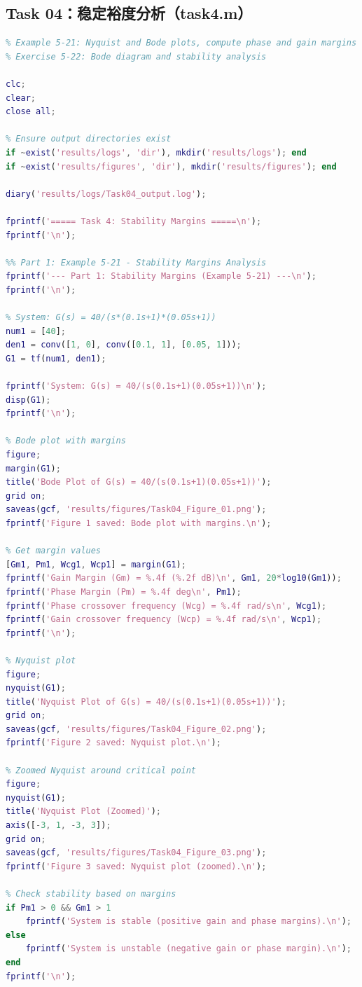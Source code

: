 \documentclass{../common/SCNU_Experimental_Report}
\begin{document}
\subsection{Task 04：稳定裕度分析（task4.m）}
\begin{lstlisting}[language=Matlab]
%% task4.m - Experiment 7, Task 4: Stability Margins
% Example 5-21: Nyquist and Bode plots, compute phase and gain margins
% Exercise 5-22: Bode diagram and stability analysis

clc;
clear;
close all;

% Ensure output directories exist
if ~exist('results/logs', 'dir'), mkdir('results/logs'); end
if ~exist('results/figures', 'dir'), mkdir('results/figures'); end

diary('results/logs/Task04_output.log');

fprintf('===== Task 4: Stability Margins =====\n');
fprintf('\n');

%% Part 1: Example 5-21 - Stability Margins Analysis
fprintf('--- Part 1: Stability Margins (Example 5-21) ---\n');
fprintf('\n');

% System: G(s) = 40/(s*(0.1s+1)*(0.05s+1))
num1 = [40];
den1 = conv([1, 0], conv([0.1, 1], [0.05, 1]));
G1 = tf(num1, den1);

fprintf('System: G(s) = 40/(s(0.1s+1)(0.05s+1))\n');
disp(G1);
fprintf('\n');

% Bode plot with margins
figure;
margin(G1);
title('Bode Plot of G(s) = 40/(s(0.1s+1)(0.05s+1))');
grid on;
saveas(gcf, 'results/figures/Task04_Figure_01.png');
fprintf('Figure 1 saved: Bode plot with margins.\n');

% Get margin values
[Gm1, Pm1, Wcg1, Wcp1] = margin(G1);
fprintf('Gain Margin (Gm) = %.4f (%.2f dB)\n', Gm1, 20*log10(Gm1));
fprintf('Phase Margin (Pm) = %.4f deg\n', Pm1);
fprintf('Phase crossover frequency (Wcg) = %.4f rad/s\n', Wcg1);
fprintf('Gain crossover frequency (Wcp) = %.4f rad/s\n', Wcp1);
fprintf('\n');

% Nyquist plot
figure;
nyquist(G1);
title('Nyquist Plot of G(s) = 40/(s(0.1s+1)(0.05s+1))');
grid on;
saveas(gcf, 'results/figures/Task04_Figure_02.png');
fprintf('Figure 2 saved: Nyquist plot.\n');

% Zoomed Nyquist around critical point
figure;
nyquist(G1);
title('Nyquist Plot (Zoomed)');
axis([-3, 1, -3, 3]);
grid on;
saveas(gcf, 'results/figures/Task04_Figure_03.png');
fprintf('Figure 3 saved: Nyquist plot (zoomed).\n');

% Check stability based on margins
if Pm1 > 0 && Gm1 > 1
    fprintf('System is stable (positive gain and phase margins).\n');
else
    fprintf('System is unstable (negative gain or phase margin).\n');
end
fprintf('\n');


\end{lstlisting}
\end{document}
